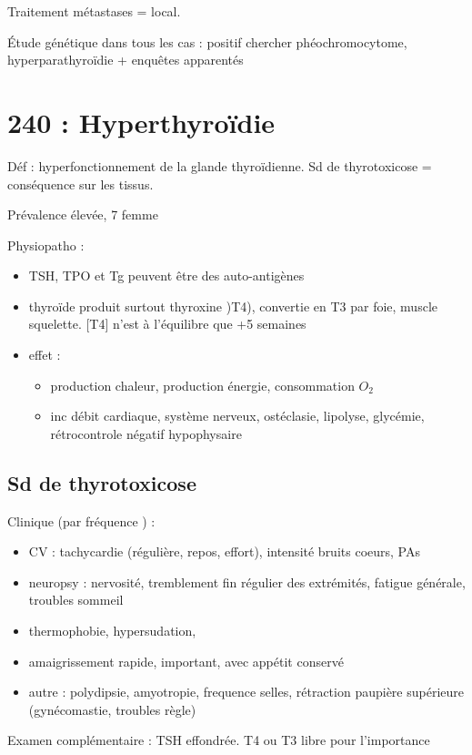 \documentclass[11pt]{article}
\begin{document}
Traitement métastases = local.

Étude génétique dans tous les cas : positif \thus chercher phéochromocytome,
hyperparathyroïdie + enquêtes apparentés
\section{240 : Hyperthyroïdie}
\label{sec:org75b7aa7}
Déf : hyperfonctionnement de la glande thyroïdienne. Sd de thyrotoxicose =
conséquence sur les tissus.

Prévalence élevée, 7\texttimes{} femme

Physiopatho :
\begin{itemize}
\item TSH, TPO et Tg peuvent être des auto-antigènes
\item thyroïde produit surtout thyroxine )T4), convertie en T3 par foie, muscle
squelette. [T4] n'est à l'équilibre que +5 semaines
\item effet : 
\begin{itemize}
\item \inc production chaleur, \inc production énergie, \inc consommation \(O_2\)
\item inc débit cardiaque, système nerveux, \inc ostéclasie, \inc lipolyse, \inc
glycémie, rétrocontrole négatif hypophysaire
\end{itemize}
\end{itemize}

\subsection{Sd de thyrotoxicose}
\label{sec:orgc2077ef}
Clinique (par fréquence \dec) :
\begin{itemize}
\item CV : tachycardie (régulière, repos, \inc effort), \inc intensité bruits
coeurs, \inc PAs
\item neuropsy : nervosité, tremblement fin régulier des extrémités, fatigue
générale, troubles sommeil
\item thermophobie, hypersudation,
\item amaigrissement rapide, important, avec appétit conservé
\item autre : polydipsie, amyotropie, \inc frequence selles, rétraction paupière
supérieure (gynécomastie, troubles règle)
\end{itemize}

Examen complémentaire : TSH effondrée. T4 ou T3 libre pour l'importance
\end{document}
